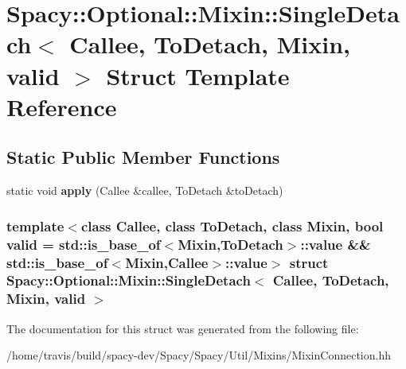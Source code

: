 \hypertarget{structSpacy_1_1Optional_1_1Mixin_1_1SingleDetach}{\section{\-Spacy\-:\-:\-Optional\-:\-:\-Mixin\-:\-:\-Single\-Detach$<$ \-Callee, \-To\-Detach, \-Mixin, valid $>$ \-Struct \-Template \-Reference}
\label{structSpacy_1_1Optional_1_1Mixin_1_1SingleDetach}
}
\subsection*{\-Static \-Public \-Member \-Functions}
\begin{DoxyCompactItemize}
\item 
\hypertarget{structSpacy_1_1Optional_1_1Mixin_1_1SingleDetach_a19a3ca88e4fd73c4c489104add58aba2}{static void {\bfseries apply} (\-Callee \&callee, \-To\-Detach \&to\-Detach)}\label{structSpacy_1_1Optional_1_1Mixin_1_1SingleDetach_a19a3ca88e4fd73c4c489104add58aba2}

\end{DoxyCompactItemize}
\subsubsection*{template$<$class Callee, class To\-Detach, class Mixin, bool valid = std\-::is\-\_\-base\-\_\-of$<$\-Mixin,\-To\-Detach$>$\-::value \&\& std\-::is\-\_\-base\-\_\-of$<$\-Mixin,\-Callee$>$\-::value$>$ struct Spacy\-::\-Optional\-::\-Mixin\-::\-Single\-Detach$<$ Callee, To\-Detach, Mixin, valid $>$}



\-The documentation for this struct was generated from the following file\-:\begin{DoxyCompactItemize}
\item 
/home/travis/build/spacy-\/dev/\-Spacy/\-Spacy/\-Util/\-Mixins/\-Mixin\-Connection.\-hh\end{DoxyCompactItemize}
